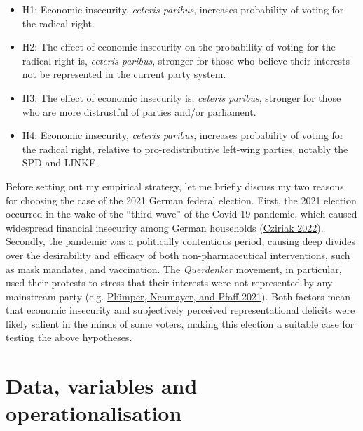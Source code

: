\documentclass[
]{article}
\providecommand{\tightlist}{%
  \setlength{\itemsep}{0pt}\setlength{\parskip}{0pt}}
\begin{document}
\begin{itemize}
\tightlist
\item
  H1: Economic insecurity, \emph{ceteris paribus}, increases probability
  of voting for the radical right.
\item
  H2: The effect of economic insecurity on the probability of voting for
  the radical right is, \emph{ceteris paribus}, stronger for those who
  believe their interests not be represented in the current party
  system.
\item
  H3: The effect of economic insecurity is, \emph{ceteris paribus},
  stronger for those who are more distrustful of parties and/or
  parliament.
\item
  H4: Economic insecurity, \emph{ceteris paribus}, increases probability
  of voting for the radical right, relative to pro-redistributive
  left-wing parties, notably the SPD and LINKE.
\end{itemize}

Before setting out my empirical strategy, let me briefly discuss my two
reasons for choosing the case of the 2021 German federal election.
First, the 2021 election occurred in the wake of the ``third wave'' of
the Covid-19 pandemic, which caused widespread financial insecurity
among German households
(\protect\hyperlink{ref-cziriak_publication_nodate}{Cziriak 2022}).
Secondly, the pandemic was a politically contentious period, causing
deep divides over the desirability and efficacy of both
non-pharmaceutical interventions, such as mask mandates, and
vaccination. The \emph{Querdenker} movement, in particular, used their
protests to stress that their interests were not represented by any
mainstream party (e.g.
\protect\hyperlink{ref-plumper_strategy_2021}{Plümper, Neumayer, and
Pfaff 2021}). Both factors mean that economic insecurity and
subjectively perceived representational deficits were likely salient in
the minds of some voters, making this election a suitable case for
testing the above hypotheses.

\hypertarget{data-variables-and-operationalisation}{%
\section{Data, variables and
operationalisation}\label{data-variables-and-operationalisation}}
\end{document}
